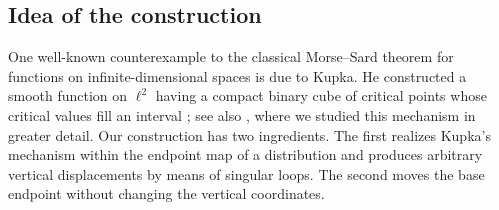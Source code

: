 \documentclass[11pt]{amsart}
\numberwithin{equation}{section}
\theoremstyle{remark}
\begin{document}
\subsection*{Idea of the construction}

One well-known counterexample to the classical Morse--Sard theorem for
functions on infinite-dimensional spaces is due to Kupka. He constructed
a smooth function on $\ell^2$ having a compact binary cube of critical
points whose critical values fill an interval \cite{Kupka}; see also
\cite[Section~4.3]{LRT}, where we studied this mechanism in greater
detail. Our construction has two ingredients. The first realizes
Kupka's mechanism within the endpoint map of a distribution and
produces arbitrary vertical displacements by means of singular loops.
The second moves the base endpoint without changing the vertical
coordinates. 
\end{document}
